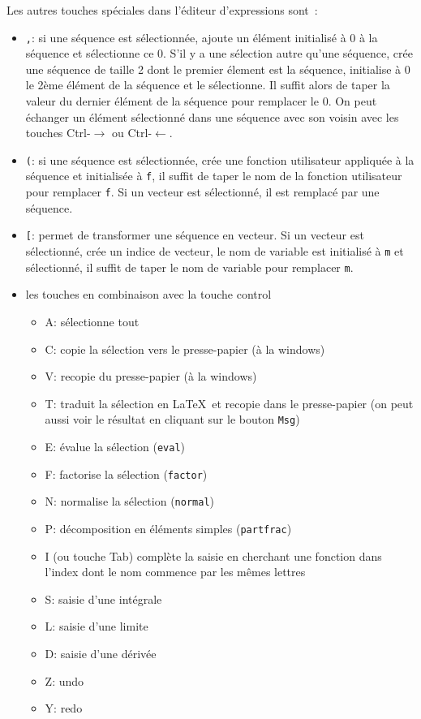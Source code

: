 \documentclass[a4paper,11pt]{article}
\begin{document}
Les autres touches sp\'eciales dans l'\'editeur d'expressions sont~:
\begin{itemize}
\item \verb|,|: si une s\'equence est s\'electionn\'ee, ajoute un \'el\'ement
initialis\'e \`a 0 \`a la s\'equence et s\'electionne ce 0. S'il y a une
s\'election autre qu'une s\'equence, 
cr\'ee une s\'equence de taille 2 dont
le premier \'element est la s\'equence, initialise \`a 0 le 2\`eme \'el\'ement
de la s\'equence et le s\'electionne. Il suffit alors de taper la valeur
du dernier \'el\'ement de la s\'equence pour remplacer le 0. On peut
\'echanger un \'el\'ement s\'electionn\'e dans une s\'equence avec son voisin avec les
touches Ctrl-$\rightarrow$ ou Ctrl-$\leftarrow$.
\item \verb|(|: si une s\'equence est s\'electionn\'ee, cr\'ee une fonction
utilisateur appliqu\'ee \`a la s\'equence et initialis\'ee \`a \verb|f|, il suffit
de taper le nom de la fonction utilisateur pour remplacer \verb|f|.
Si un vecteur est s\'electionn\'e, il est remplac\'e par une s\'equence.
\item \verb|[|: permet de transformer une s\'equence en vecteur. Si un
vecteur est s\'electionn\'e, cr\'ee un indice de vecteur, le nom de variable
est initialis\'e \`a \verb|m| et s\'electionn\'e, il suffit de taper le nom
de variable pour remplacer \verb|m|.
\item les touches en combinaison avec la touche control
\begin{itemize}
\item A: s\'electionne tout
\item C: copie la s\'election vers le presse-papier (\`a la windows)
\item V: recopie du presse-papier (\`a la windows)
\item T: traduit la s\'election en \LaTeX\ et recopie dans le
presse-papier (on peut aussi voir le r\'esultat en cliquant sur
le bouton \verb|Msg|)
\item E: \'evalue la s\'election (\verb|eval|)
\item F: factorise la s\'election (\verb|factor|)
\item N: normalise la s\'election (\verb|normal|)
\item P: d\'ecomposition en \'el\'ements simples (\verb|partfrac|)
\item I (ou touche Tab) 
compl\`ete la saisie en cherchant une fonction dans l'index
dont le nom commence par les m\^emes lettres
\item S: saisie d'une int\'egrale
\item L: saisie d'une limite
\item D: saisie d'une d\'eriv\'ee
\item Z: undo 
\item Y: redo
\end{itemize}
\end{itemize}
\end{document}
